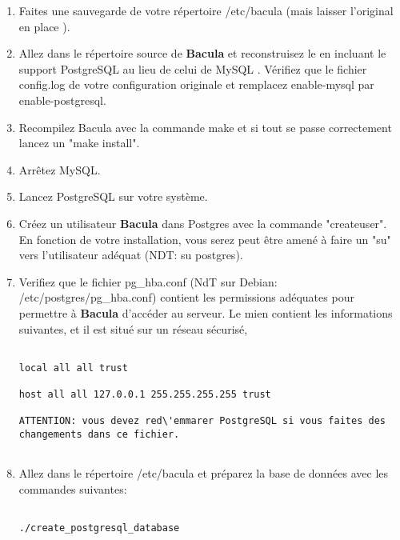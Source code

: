 {{{{\begin{enumerate}
   \footnotesize
\begin{verbatim}

       mysqldump -f -t -n >bacula-backup.dmp
    
\end{verbatim}
\normalsize

\item Faites une sauvegarde de votre r\'epertoire /etc/bacula (mais laisser
   l'original en place  ).  
\item Allez dans le r\'epertoire source de {\bf Bacula} et reconstruisez le en
   incluant le support  PostgreSQL au lieu de celui de MySQL . V\'erifiez que  le
   fichier config.log de votre configuration originale et remplacez enable-mysql
par enable-postgresql.  
\item Recompilez Bacula avec la commande make et si tout se passe correctement
 lancez un "make install".  
\item Arr\^etez MySQL. 
\item Lancez PostgreSQL sur votre syst\`eme.  
\item Cr\'eez un utilisateur {\bf Bacula} dans Postgres avec la commande
   "createuser".  En fonction de votre installation, vous serez peut \^etre
   amen\'e \`a faire un "su" vers l'utilisateur ad\'equat (NDT: su postgres).  
\item Verifiez que le fichier pg\_hba.conf (NdT sur Debian:
   /etc/postgres/pg\_hba.conf) contient les permissions ad\'equates pour
   permettre \`a {\bf Bacula} d'acc\'eder au serveur. Le mien contient les
informations suivantes, et il est situ\'e sur un r\'eseau s\'ecuris\'e,  

\footnotesize
\begin{verbatim}

local all all trust
                
host all all 127.0.0.1 255.255.255.255 trust
                
ATTENTION: vous devez red\'emmarer PostgreSQL si vous faites des changements dans ce fichier.
      
\end{verbatim}
\normalsize

\item Allez dans le r\'epertoire /etc/bacula et pr\'eparez la base de
   donn\'ees avec les commandes suivantes:  

\footnotesize
\begin{verbatim}

./create_postgresql_database
                                

\end{verbatim}
\end{enumerate}}}}}
